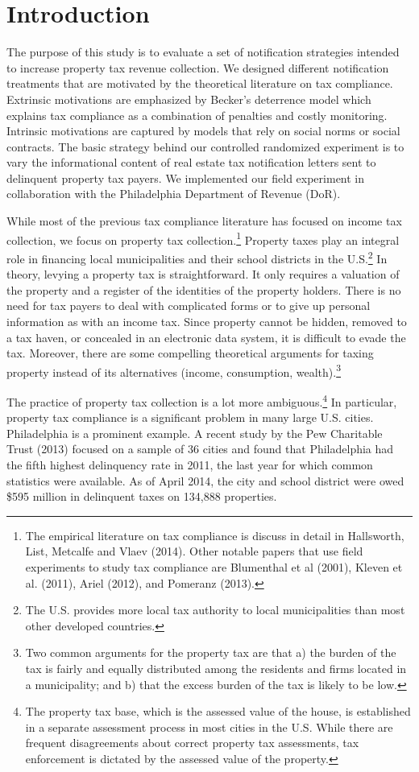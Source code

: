 \documentclass[12pt,titlepage]{article}
\begin{document}
\section{Introduction}

The purpose of this study is to evaluate a set of notification
strategies intended to increase property tax revenue collection.  We
designed different notification treatments that are motivated by the
theoretical literature on tax compliance.  Extrinsic motivations are
emphasized by Becker's deterrence model which explains tax
compliance as a combination of penalties and costly
monitoring. Intrinsic motivations are captured by models that rely on
social norms or social contracts.  The basic strategy behind our
controlled randomized experiment is to vary the informational content
of real estate tax notification letters sent to delinquent property tax payers.
We implemented our field experiment in collaboration with the Philadelphia 
Department of Revenue (DoR).

While most of the previous tax compliance literature has focused on
income tax collection, we focus on property tax
collection.\footnote{The empirical literature on tax compliance is
  discuss in detail in Hallsworth, List, Metcalfe and Vlaev (2014).
  Other notable papers that use field experiments to study tax
  compliance are Blumenthal et al (2001), Kleven et al. (2011), Ariel
  (2012), and Pomeranz (2013).}  Property taxes play an integral role
in financing local municipalities and their school districts in the
U.S.\footnote{The U.S.  provides more local tax authority to local
  municipalities than most other developed countries.} In theory,
levying a property tax is straightforward.  It only requires a
valuation of the property and a register of the identities of the
property holders. There is no need for tax payers to deal with
complicated forms or to give up personal information as with an income
tax.  Since property cannot be hidden, removed to a tax haven, or
concealed in an electronic data system, it is difficult to evade the
tax. Moreover, there are some compelling theoretical arguments for
taxing property instead of its alternatives (income, consumption,
wealth).\footnote{Two common arguments for the property tax are that
  a) the burden of the tax is fairly and equally distributed among the
  residents and firms located in a municipality; and b) that the
  excess burden of the tax is likely to be low.}

The practice of property tax collection is a lot more
ambiguous.\footnote{The property tax base, which is the assessed value
  of the house, is established in a separate assessment process in
  most cities in the U.S. While there are frequent disagreements about
  correct property tax assessments, tax enforcement is dictated by the
  assessed value of the property.} In particular, property tax
compliance is a significant problem in many large
U.S. cities. Philadelphia is a prominent example.  A recent study by
the Pew Charitable Trust (2013) focused on a sample of 36 cities and
found that Philadelphia had the fifth highest delinquency rate in
2011, the last year for which common statistics were available.  As of
April 2014, the city and school district were owed \$595 million in
delinquent taxes on 134,888 properties.
\end{document}
